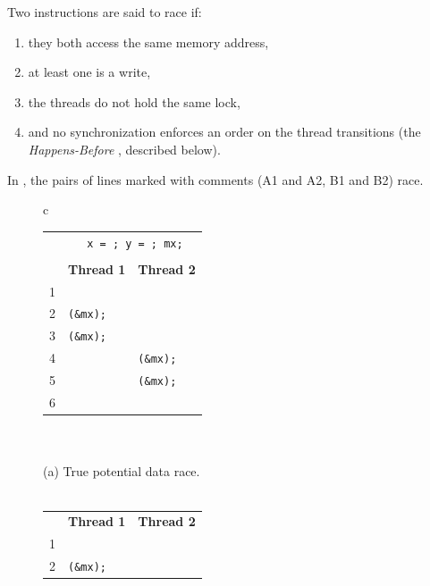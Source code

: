 Two instructions are said to race if:
\begin{enumerate}
	\item they both access the same memory address,
	\item at least one is a write,
	\item the threads do not hold the same lock,
	\item and no synchronization enforces an order on the thread transitions
		(the {\em Happens-Before} , described below).
\end{enumerate}
In , the pairs of lines marked with comments (A1 and A2, B1 and B2) race.

\begin{figure}[h]
        \small
	\begin{center}
\begin{tabular}{c}
\begin{tabular}{rll}
	& \multicolumn{2}{c}{\texttt{\ctype{int} x = \const{0}; \ctype{bool} y = \const{false}; \ctype{mutex\_t} mx;}} \\
        \\
        & {\bf Thread 1} & {\bf Thread 2} \\
	1 & \texttt{\hilight{brickred}{x++;}~\ccomment{// A1}} & \\
	2 & \texttt{\call{mutex\_lock}(\&mx);} & \\
	3 & \texttt{\call{mutex\_unlock}(\&mx);} & \\
	4 & & \texttt{\call{mutex\_lock}(\&mx);} \\
	5 & & \texttt{\call{mutex\_unlock}(\&mx);} \\
	6 & & \texttt{\hilight{brickred}{x++;}~\ccomment{// A2}} \\
\end{tabular}
\\
\\
	{\normalsize (a) True potential data race.}
\\
\\
\begin{tabular}{rll}
        & {\bf Thread 1} & {\bf Thread 2} \\
	1 & \texttt{\hilight{brickred}{x++;}~\ccomment{// B1}} & \\
	2 & \texttt{\call{mutex\_lock}(\&mx);} & \\

\end{tabular}
\end{tabular}
\end{center}
\end{figure}
